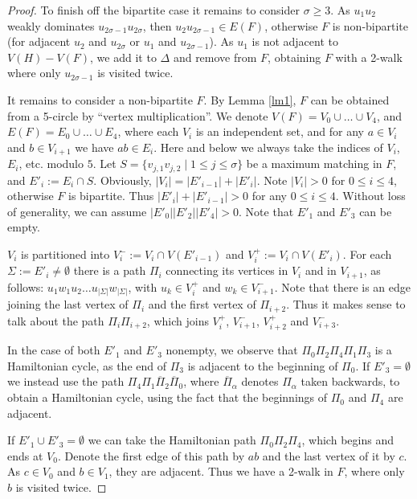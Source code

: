 \documentclass{amsart}
\theoremstyle{definition}
\begin{document}
\begin{proof}
To finish off the bipartite case it remains to consider $\sigma\geq 3$.
As $u_1u_2$ weakly dominates $u_{2\sigma-1}u_{2\sigma}$, then $u_2u_{2\sigma-1}\in E(F)$, 
otherwise $F$ is
non-bipartite (for adjacent $u_2$ and $u_{2\sigma}$ or $u_1$ and $u_{2\sigma-1}$).
As $u_1$ is not adjacent to   $V(H)-V(F)$, we add it to $\Delta$ and remove from $F$,
obtaining $F$ with a 2-walk where only $u_{2\sigma-1}$ is visited twice. 


\medskip

It remains to consider a non-bipartite $F$. By Lemma \ref{lm1},
$F$ can be obtained from a 5-circle by ``vertex multiplication''. We
denote $V(F)=V_0\cup \dots \cup V_4$, and
$E(F)=E_0\cup \dots \cup E_4$, where each $V_i$ is an
independent set, and  for any $a\in V_i$ and $b\in V_{i+1}$ we have $ab\in E_i$. 
Here and below we always take the indices of $V_i$, $E_i$, etc. modulo $5$.
Let $S=\{v_{j,1}v_{j,2}\mid 1\leq j\leq \sigma\}$ be a maximum matching in $F$, and $E'_i:=E_i\cap S$.
Obviously,
$|V_i|=|E'_{i-1}|+|E'_i|$. Note $|V_i|>0$ for $0\leq i\leq 4$, otherwise
$F$ is bipartite. Thus $|E'_i|+|E'_{i-1}|>0$ for any $0\leq i\leq 4$. 
Without loss of generality, we can assume $|E'_0||E'_2||E'_4|>0$.
Note that $E'_1$ and $E'_3$ can be empty.

$V_i$ is partitioned into
$V_i^-:= V_i\cap V(E'_{i-1})$ and 
$V_i^+:= V_i\cap V(E'_{i})$. For each $\Sigma:=E'_i\neq\emptyset$ there is
a path $\Pi_i$ connecting its vertices in $V_i$ and in $V_{i+1}$, 
as follows: $u_1 w_1 u_2\dots u_{|\Sigma|}w_{|\Sigma|}$, with 
$u_k\in V_i^+$ and $w_k\in V_{i+1}^-$.%
Note that there is an edge joining the last vertex of $\Pi_i$ and
the first vertex of $\Pi_{i+2}$. Thus it makes sense to talk about the path
$\Pi_i\Pi_{i+2}$, which joins $V_i^+$, $V_{i+1}^-$, $V_{i+2}^+$ and
$V_{i+3}^-$.

In the case of both $E'_1$ and $E'_3$ nonempty, we observe that 
$\Pi_0\Pi_2\Pi_4\Pi_1\Pi_3$ is a Hamiltonian cycle, as the end of
$\Pi_3$ is adjacent to the beginning of $\Pi_0$. 
If $E'_3=\emptyset$  
we instead use the path 
$\Pi_4\Pi_1\overline{\Pi}_2\overline{\Pi}_0$, where $\overline{\Pi}_\alpha$
denotes $\Pi_\alpha$ taken backwards, to obtain a Hamiltonian
cycle, using the fact that the beginnings of $\Pi_0$ and $\Pi_4$ are
adjacent.

If $E'_1\cup E'_3=\emptyset$ 
we can take the Hamiltonian path $\Pi_0\Pi_2\Pi_4$, 
which begins and ends at $V_0$. Denote the first
edge of this path by $ab$ and the last vertex of it 
by $c$. As $c\in V_0$ and $b\in V_1$, they are adjacent.
Thus we have a 2-walk in $F$, where only $b$ is visited
twice.
\end{proof}
\end{document}
